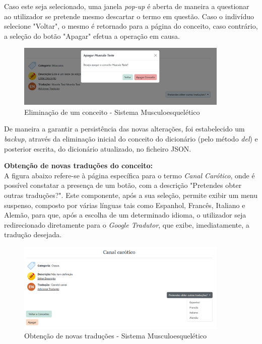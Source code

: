 Caso este seja selecionado, uma janela \textit{pop-up} é aberta de maneira a questionar ao utilizador se pretende mesmo descartar o termo em questão. Caso o indivíduo selecione "Voltar", o mesmo é retornado para a página do conceito, caso contrário, a seleção do botão "Apagar" efetua a operação em causa.

\begin{figure}[H]
    \centering
    \centering
    \includegraphics[width=0.9\textwidth]{Images/apagar_termo.png}
    \caption{Eliminação de um conceito - Sistema Musculoesquelético}
    \label{fig:dic-traduc1}
\end{figure}

De maneira a garantir a persistência das novas alterações, foi estabelecido um \textit{backup}, através da eliminação inicial do conceito do dicionário (pelo método \textit{del}) e posterior escrita, do dicionário atualizado, no ficheiro JSON.

\textbf{Obtenção de novas traduções do conceito:}\\

A figura abaixo refere-se à página específica para o termo \textit{Canal Carótico}, onde é possível constatar a presença de um botão, com a descrição "Pretendes obter outras traduções?".
Este componente, após a sua seleção, permite exibir um menu suspenso, composto por várias línguas tais como Espanhol, Francês, Italiano e Alemão, para que, após a escolha de um determinado idioma, o utilizador seja redirecionado diretamente para o \textit{Google Tradutor}, que exibe, imediatamente, a tradução desejada.

\begin{figure}[H]
    \centering
    \centering
    \includegraphics[width=0.9\textwidth]{Images/outras_trad.png}
    \caption{Obtenção de novas traduções - Sistema Musculoesquelético}
    \label{fig:dic-traduc1}
\end{figure}

